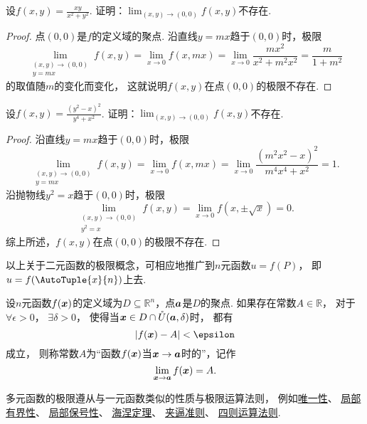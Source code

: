 \begin{example}
设\(f(x,y) = \frac{xy}{x^2+y^2}\).
证明：\(\lim_{(x,y)\to(0,0)} f(x,y)\)不存在.
\begin{proof}
点\((0,0)\)是\(f\)的定义域的聚点.
沿直线\(y=mx\)趋于\((0,0)\)时，极限\[
	\lim_{\substack{(x,y)\to(0,0) \\ y=mx}} f(x,y)
	= \lim_{x\to0} f(x,mx)
	= \lim_{x\to0} \frac{mx^2}{x^2+m^2x^2}
	= \frac{m}{1+m^2}
\]的取值随\(m\)的变化而变化，
这就说明\(f(x,y)\)在点\((0,0)\)的极限不存在.
\end{proof}
\end{example}
\begin{example}
设\(f(x,y) = \frac{(y^2-x)^2}{y^4+x^2}\).
证明：\(\lim_{(x,y)\to(0,0)} f(x,y)\)不存在.
\begin{proof}
沿直线\(y=mx\)趋于\((0,0)\)时，极限\[
	\lim_{\substack{(x,y)\to(0,0) \\ y=mx}} f(x,y)
	= \lim_{x\to0} f(x,mx)
	= \lim_{x\to0} \frac{(m^2x^2-x)^2}{m^4x^4+x^2}
	= 1.
\]
沿抛物线\(y^2=x\)趋于\((0,0)\)时，极限\[
	\lim_{\substack{(x,y)\to(0,0) \\ y^2=x}} f(x,y)
	= \lim_{x\to0} f(x,\pm\sqrt{x})
	= 0.
\]
综上所述，\(f(x,y)\)在点\((0,0)\)的极限不存在.
\end{proof}
\end{example}

以上关于二元函数的极限概念，可相应地推广到\(n\)元函数\(u = f(P)\)，
即\(u = f(\AutoTuple{x}{n})\)上去.
\begin{definition}
设\(n\)元函数\(f(\boldsymbol{x})\)的定义域为\(D \subseteq \mathbb{R}^n\)，点\(\boldsymbol{a}\)是\(D\)的聚点.
如果存在常数\(A \in \mathbb{R}\)，
对于\(\forall\epsilon>0\)，
\(\exists\delta>0\)，
使得当\(\boldsymbol{x} \in D \cap \mathring{U}(\boldsymbol{a},\delta)\)时，
都有\[
	\abs{f(\vb{x}) - A} < \epsilon
\]成立，
则称常数\(A\)为“函数\(f(\boldsymbol{x})\)当\(\boldsymbol{x}\to\boldsymbol{a}\)时的”，记作\[
	\lim_{\boldsymbol{x}\to\boldsymbol{a}} f(\boldsymbol{x}) = A.
\]
\end{definition}

多元函数的极限遵从与一元函数类似的性质与极限运算法则，
例如\hyperref[theorem:极限.函数极限的唯一性]{唯一性}、
\hyperref[theorem:极限.函数极限的局部有界性]{局部有界性}、
\hyperref[theorem:极限.函数极限的局部保号性1]{局部保号性}、
\hyperref[theorem:极限.海涅定理]{海涅定理}、
\hyperref[theorem:函数极限.夹逼准则]{夹逼准则}、
\hyperref[theorem:极限.极限的四则运算法则]{四则运算法则}.

